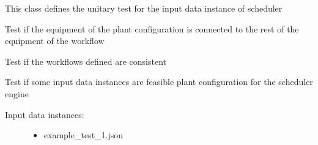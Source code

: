\documentclass[letterpaper,10pt,english]{sphinxmanual}
\begin{document}
\begin{fulllineitems}
\label{\detokenize{index:test.test_data.DataTest}}
\sphinxAtStartPar
{}

\sphinxAtStartPar
This class defines the unitary test for the input data instance of scheduler

\begin{fulllineitems}
\label{\detokenize{index:test.test_data.DataTest.test_connectivity}}
\sphinxAtStartPar
{}

\sphinxAtStartPar
Test if the equipment of the plant configuration is connected to the rest of the equipment of the workflow

\end{fulllineitems}


\begin{fulllineitems}
\label{\detokenize{index:test.test_data.DataTest.test_consistency}}
\sphinxAtStartPar
{}

\sphinxAtStartPar
Test if the workflows defined are consistent

\end{fulllineitems}


\begin{fulllineitems}
\label{\detokenize{index:test.test_data.DataTest.test_data_input}}
\sphinxAtStartPar
{}

\sphinxAtStartPar
Test if some input data instances are feasible plant configuration for the scheduler engine
\begin{description}
\item[{Input data instances:}] \leavevmode\begin{itemize}
\item {} 
\sphinxAtStartPar
example\_test\_1.json


\end{itemize}
\end{description}
\end{fulllineitems}
\end{fulllineitems}
\end{document}
